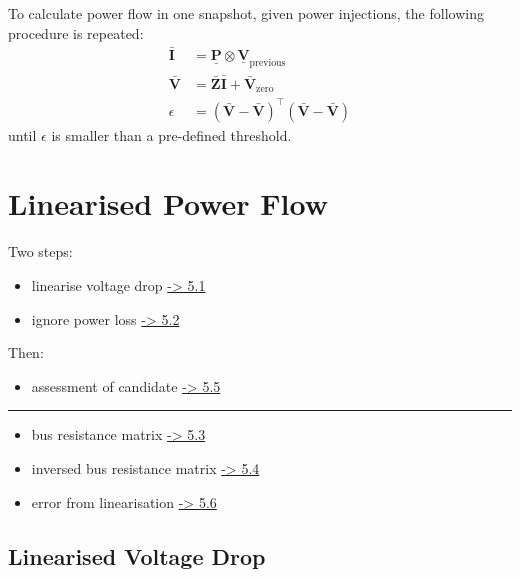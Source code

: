 \documentclass[
]{book}
\providecommand{\tightlist}{%
  \setlength{\itemsep}{0pt}\setlength{\parskip}{0pt}}
\begin{document}
To calculate power flow in one snapshot, given power injections, the following
procedure is repeated:
\[ \begin{aligned}
    \boldsymbol{\bar{I}} &= \boldsymbol{\underline{P}}
      \otimes \boldsymbol{\underline{V}}_\text{previous} \\
    \boldsymbol{\bar{V}}
    &= \boldsymbol{\bar{Z}} \boldsymbol{\bar{I}}
      + \boldsymbol{\bar{V}}_\text{zero} \\
    \epsilon
    &= \left( \boldsymbol{\bar{V}} - \boldsymbol{\bar{V}} \right)^\top
      \left( \boldsymbol{\bar{V}} - \boldsymbol{\bar{V}} \right)
\end{aligned} \]
until \(\epsilon\) is smaller than a pre-defined threshold.

\hypertarget{linearised-power-flow}{%
\chapter{Linearised Power Flow}\label{linearised-power-flow}}

Two steps:

\begin{itemize}
\tightlist
\item
  linearise voltage drop \protect\hyperlink{linearVoltageDrop}{-\textgreater{} 5.1}
\item
  ignore power loss \protect\hyperlink{linearVoltage}{-\textgreater{} 5.2}
\end{itemize}

Then:

\begin{itemize}
\tightlist
\item
  assessment of candidate \protect\hyperlink{assessment}{-\textgreater{} 5.5}
\end{itemize}

\begin{center}\rule{0.5\linewidth}{0.5pt}\end{center}

\begin{itemize}
\tightlist
\item
  bus resistance matrix \protect\hyperlink{BRM}{-\textgreater{} 5.3}
\item
  inversed bus resistance matrix \protect\hyperlink{brmInv}{-\textgreater{} 5.4}
\item
  error from linearisation \protect\hyperlink{error}{-\textgreater{} 5.6}
\end{itemize}

\hypertarget{linearVoltageDrop}{%
\section{Linearised Voltage Drop}\label{linearVoltageDrop}}
\end{document}
